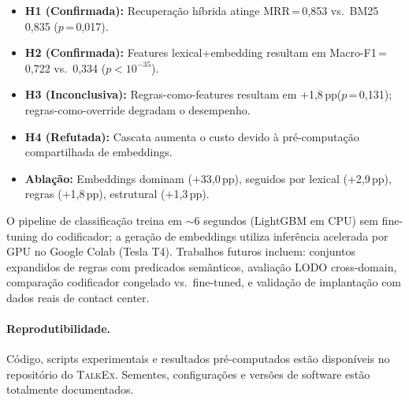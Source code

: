 \documentclass[11pt]{article}
\newcommand{\talkex}{\textsc{TalkEx}}
\newcommand{\macrof}{Macro-F1}
\newcommand{\pp}{\,pp}
\begin{document}
\begin{itemize}[leftmargin=*,itemsep=2pt]
    \item \textbf{H1 (Confirmada):} Recuperação híbrida atinge MRR\,=\,0,853 vs.\ BM25 0,835 ($p$\,=\,0,017).
    \item \textbf{H2 (Confirmada):} Features lexical+embedding resultam em \macrof{}\,=\,0,722 vs.\ 0,334 ($p < 10^{-35}$).
    \item \textbf{H3 (Inconclusiva):} Regras-como-features resultam em $+$1,8\pp ($p$\,=\,0,131); regras-como-override degradam o desempenho.
    \item \textbf{H4 (Refutada):} Cascata aumenta o custo devido à pré-computação compartilhada de embeddings.
    \item \textbf{Ablação:} Embeddings dominam ($+$33,0\pp), seguidos por lexical ($+$2,9\pp), regras ($+$1,8\pp), estrutural ($+$1,3\pp).
\end{itemize}

O pipeline de classificação treina em $\sim$6 segundos (LightGBM em CPU) sem fine-tuning do codificador; a geração de embeddings utiliza inferência acelerada por GPU no Google Colab (Tesla T4). Trabalhos futuros incluem: conjuntos expandidos de regras com predicados semânticos, avaliação LODO cross-domain, comparação codificador congelado vs.\ fine-tuned, e validação de implantação com dados reais de contact center.

\paragraph{Reprodutibilidade.} Código, scripts experimentais e resultados pré-computados estão disponíveis no repositório do \talkex{}. Sementes, configurações e versões de software estão totalmente documentados.
\end{document}
